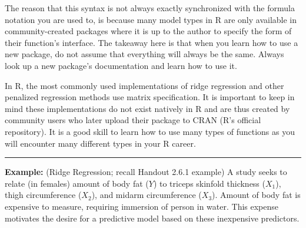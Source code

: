 \documentclass{article}\usepackage[]{graphicx}\usepackage[]{color}
\begin{document}
The reason that this syntax is not always exactly synchronized with the formula notation you are used to, is because many model types in R are only available in community-created packages where it is up to the author to specify the form of their function's interface. The takeaway here is that when you learn how to use a new package, do not assume that everything will always be the same. Always look up a new package's documentation and learn how to use it.

In R, the most commonly used implementations of ridge regression and other penalized regression methods use matrix specification. It is important to keep in mind these implementations do not exist natively in R and are thus created by community users who later upload their package to CRAN (R's official repository). It is a good skill to learn how to use many types of functions as you will encounter many different types in your R career.

\medskip
\hrule
\medskip

\textbf{Example: } (Ridge Regression; recall Handout 2.6.1 example) A study seeks to relate (in females) amount of body fat ($Y$) to triceps skinfold thickness ($X_1$), thigh circumference ($X_2$), and midarm circumference ($X_3$).  Amount of body fat is expensive to measure, requiring immersion of person in water.  This expense motivates the desire for a predictive model based on these inexpensive predictors.
\end{document}
